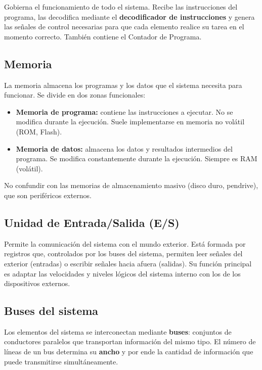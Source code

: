 Gobierna el funcionamiento de todo el sistema. Recibe las instrucciones del programa, las decodifica mediante el \textbf{decodificador de instrucciones} y genera las señales de control necesarias para que cada elemento realice su tarea en el momento correcto. También contiene el Contador de Programa.

\subsection{Memoria}

La memoria almacena los programas y los datos que el sistema necesita para funcionar. Se divide en dos zonas funcionales:

\begin{itemize}
  \item \textbf{Memoria de programa:} contiene las instrucciones a ejecutar. No se modifica durante la ejecución. Suele implementarse en memoria no volátil (ROM, Flash).
  \item \textbf{Memoria de datos:} almacena los datos y resultados intermedios del programa. Se modifica constantemente durante la ejecución. Siempre es RAM (volátil).
\end{itemize}

\begin{notabox}
No confundir con las memorias de almacenamiento masivo (disco duro, pendrive), que son periféricos externos.
\end{notabox}

\subsection{Unidad de Entrada/Salida (E/S)}

Permite la comunicación del sistema con el mundo exterior. Está formada por registros que, controlados por los buses del sistema, permiten leer señales del exterior (entradas) o escribir señales hacia afuera (salidas). Su función principal es adaptar las velocidades y niveles lógicos del sistema interno con los de los dispositivos externos.

\subsection{Buses del sistema}

Los elementos del sistema se interconectan mediante \textbf{buses}: conjuntos de conductores paralelos que transportan información del mismo tipo. El número de líneas de un bus determina su \textbf{ancho} y por ende la cantidad de información que puede transmitirse simultáneamente.

